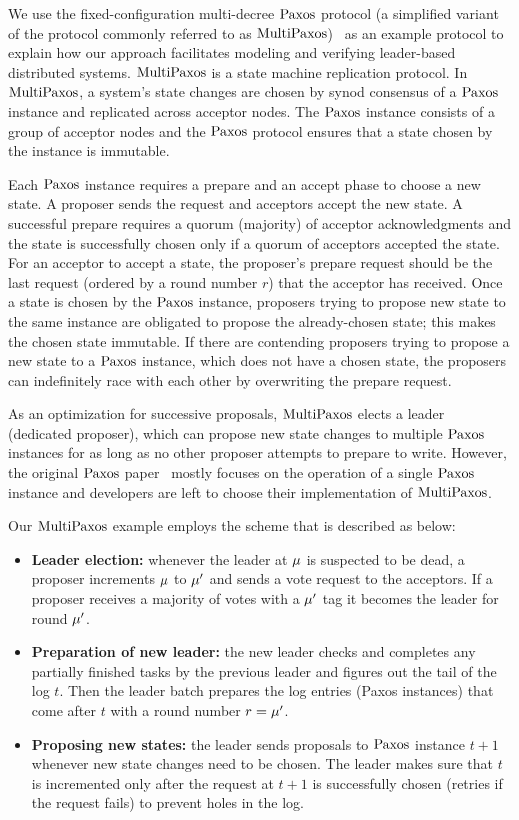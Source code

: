 We use the fixed-configuration multi-decree $\mathrm{Paxos}$ protocol (a simplified variant
of the protocol commonly referred to as $\mathrm{MultiPaxos}$)~\cite{rvrpaxos}
as an example protocol to explain how our approach facilitates modeling and
verifying leader-based distributed systems. $\mathrm{MultiPaxos}$ is a
state machine replication protocol. In $\mathrm{MultiPaxos}$, a system's state changes
are chosen by synod consensus of a $\mathrm{Paxos}$ instance and replicated across acceptor nodes.
The $\mathrm{Paxos}$ instance consists of a group of acceptor nodes and the $\mathrm{Paxos}$ protocol
ensures that a state chosen by the instance is immutable.

Each $\mathrm{Paxos}$ instance requires a prepare and an accept phase to choose a new
state. A proposer sends the request and acceptors accept the new state.
A successful prepare requires a quorum (majority) of acceptor acknowledgments
and the state is successfully chosen only if a quorum of acceptors
accepted the state. For an acceptor to accept a state, the proposer's prepare
request should be the last request (ordered by a round number $r$)
that the acceptor has received. Once a state is chosen by the $\mathrm{Paxos}$ instance,
proposers trying to propose new state to the same instance are obligated to
propose the already-chosen state; this makes the chosen state immutable.
If there are contending proposers trying to propose a new
state to a $\mathrm{Paxos}$ instance, which does not have a chosen state, the proposers
can indefinitely race with each other by overwriting the prepare request.

As an optimization for successive proposals, $\mathrm{MultiPaxos}$ elects a
leader (dedicated proposer), which can propose new state changes to multiple $\mathrm{Paxos}$
instances for as long as no other proposer attempts to prepare to write. However, the
original $\mathrm{Paxos}$ paper~\cite{paxos, paxosmadesimple} mostly focuses on the operation
of a single $\mathrm{Paxos}$ instance
and developers are left to choose their implementation of $\mathrm{MultiPaxos}$.

Our $\mathrm{MultiPaxos}$ example employs the scheme that is described as below:
\begin{itemize}
	\item {\textbf{Leader election: }} whenever the leader at $\mu$ is
		suspected to be dead, a proposer increments $\mu$ to $\mu'$ and
		sends a vote request to the acceptors.
		If a proposer receives a majority of votes with a $\mu'$ tag it
		becomes the leader for round $\mu'$.
	\item {\textbf{Preparation of new leader: }} the new leader checks and completes any
		partially finished tasks by the previous leader and figures out the
		tail of the log $t$. Then the leader batch prepares the log entries
		(Paxos instances) that come after $t$ with a round number $r = \mu'$.
	\item {\textbf{Proposing new states: }} the leader sends proposals
		to $\mathrm{Paxos}$ instance $t+1$ whenever new state changes need to be chosen.
		The leader makes sure that $t$ is incremented only after the
		request at $t+1$ is successfully chosen (retries if the
		request fails) to prevent holes in the log.
\end{itemize}


